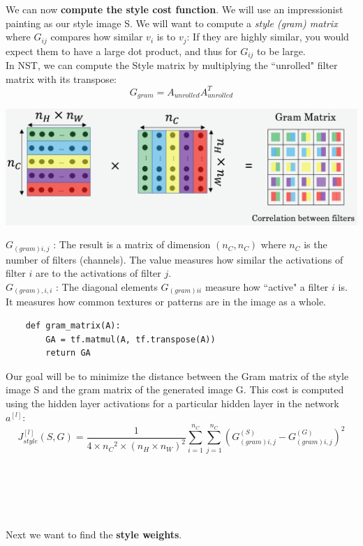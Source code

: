 \documentclass[11pt, a4paper]{article}
\begin{document}
\begin{spacing}{1.1}
	\noindent We can now \textbf{compute the style cost function}. We will use an impressionist painting as our style image S. We will want to compute a \textit{style (gram) matrix} where $G_{ij}$ compares how similar $v_i$ is to $v_j$: If they are highly similar, you would expect them to have a large dot product, and thus for $G_{ij}$ to be large.\vspace*{1mm}\\
	In NST, we can compute the Style matrix by multiplying the ``unrolled" filter matrix with its transpose:
	$$ G_{gram} = A_{unrolled}A_{unrolled}^T $$
	\begin{center} \includegraphics[scale=0.25]{gm}	\end{center}
	$G_{(gram)i,j}$ : The result is a matrix of dimension $(n_C,n_C)$ where $n_C$ is the number of filters (channels). The value measures how similar the activations of filter $i$ are to the activations of filter $j$. \vspace*{1mm}\\
	$G_{(gram),i,i}$ : The diagonal elements $G_{(gram)ii}$ measure how ``active" a filter $i$ is. It measures how common textures or patterns are in the image as a whole.
	\begin{lstlisting}
	def gram_matrix(A):
		GA = tf.matmul(A, tf.transpose(A))
		return GA	\end{lstlisting} \vspace*{1mm}
	Our goal will be to minimize the distance between the Gram matrix of the style image S and the gram matrix of the generated image G. This cost is computed using the hidden layer activations for a particular hidden layer in the network $a^{[l]}$:
	$$J_{style}^{[l]}(S,G) = \frac{1}{4 \times {n_C}^2 \times (n_H \times n_W)^2} \sum _{i=1}^{n_C}\sum_{j=1}^{n_C}(G^{(S)}_{(gram)i,j} - G^{(G)}_{(gram)i,j})^2$$
	\begin{lstlisting}
	
	
	
	
	\end{lstlisting} \newpage

	\noindent Next we want to find the \textbf{style weights}.
	
	
	
	
	
	
	
	
	
	
\end{spacing}
\end{document}
